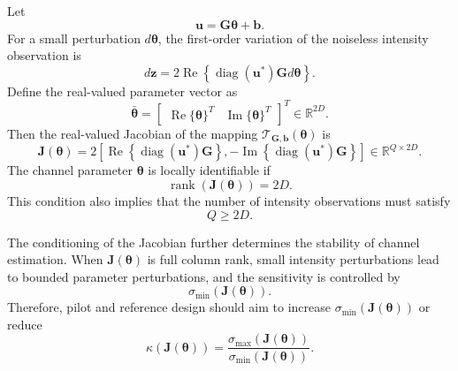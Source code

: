 \documentclass[journal]{IEEEtran}
\begin{document}
Let
\begin{equation}
\mathbf{u}
=
\mathbf{G}\boldsymbol{\theta}+\mathbf{b}.
\end{equation}
For a small perturbation $d\boldsymbol{\theta}$, the first-order variation of the noiseless intensity observation is
\begin{equation}
d\mathbf{z}
=
2\operatorname{Re}
\left\{
\operatorname{diag}(\mathbf{u}^*)\mathbf{G}d\boldsymbol{\theta}
\right\}.
\label{eq:intensity_differential}
\end{equation}
Define the real-valued parameter vector as
\begin{equation}
\bar{\boldsymbol{\theta}}
=
\begin{bmatrix}
\operatorname{Re}\{\boldsymbol{\theta}\}^T &
\operatorname{Im}\{\boldsymbol{\theta}\}^T
\end{bmatrix}^T
\in\mathbb{R}^{2D}.
\end{equation}
Then the real-valued Jacobian of the mapping $\mathcal{T}_{\mathbf{G},\mathbf{b}}(\boldsymbol{\theta})$ is
\begin{equation}
\mathbf{J}(\boldsymbol{\theta}) = 2 \left[ \operatorname{Re}
\left\{ \operatorname{diag}(\mathbf{u}^*)\mathbf{G} \right\}, - \operatorname{Im} \left\{ \operatorname{diag}(\mathbf{u}^*)\mathbf{G} \right\} \right] \in\mathbb{R}^{Q\times 2D}. \label{eq:real_jacobian}
\end{equation}
The channel parameter $\boldsymbol{\theta}$ is locally identifiable if
\begin{equation}
\operatorname{rank}\left(\mathbf{J}(\boldsymbol{\theta})\right)
=
2D.
\label{eq:jacobian_full_rank}
\end{equation}
This condition also implies that the number of intensity observations must satisfy
\begin{equation}
Q\geq 2D.
\label{eq:measurement_number_necessary}
\end{equation}

The conditioning of the Jacobian further determines the stability of channel estimation. 
When $\mathbf{J}(\boldsymbol{\theta})$ is full column rank, small intensity perturbations lead to bounded parameter perturbations, and the sensitivity is controlled by
\begin{equation}
\sigma_{\min}\left(\mathbf{J}(\boldsymbol{\theta})\right).
\end{equation}
Therefore, pilot and reference design should aim to increase $\sigma_{\min}(\mathbf{J}(\boldsymbol{\theta}))$ or reduce
\begin{equation}
\kappa\left(\mathbf{J}(\boldsymbol{\theta})\right)
=
\frac{
\sigma_{\max}(\mathbf{J}(\boldsymbol{\theta}))
}{
\sigma_{\min}(\mathbf{J}(\boldsymbol{\theta}))
}.
\end{equation}
\end{document}
